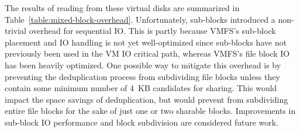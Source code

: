 \fi

The results of reading from these virtual disks are summarized in
Table~\ref{table:mixed-block-overhead}.  Unfortunately, sub-blocks
introduced a non-trivial overhead for sequential IO.  This is partly
because VMFS's sub-block placement and IO handling is not yet
well-optimized since sub-blocks have not previously been used in the
VM IO critical path, whereas VMFS's file block IO has been heavily
optimized.  One possible way to mitigate this overhead is by
preventing the deduplication process from subdividing file blocks
unless they contain some minimum number of 4~KB candidates for
sharing.  This would impact the space savings of deduplication, but
would prevent \DeDe from subdividing entire file blocks for the sake
of just one or two sharable blocks.  Improvements in sub-block IO
performance and block subdivision are considered future work.



